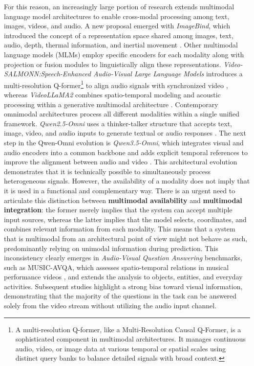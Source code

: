 For this reason, an increasingly large portion of research extends multimodal language model architectures to enable cross-modal processing among text, images, videos, and audio. 
A new proposal emerged with \textit{ImageBind}, which introduced the concept of a representation space shared among images, text, audio, depth, thermal information, and inertial movement \cite{girdhar2023imagebind}.
Other multimodal language models (\acsp{MLM}) employ specific encoders for each modality along with projection or fusion modules to linguistically align these representations. \textit{Video-SALMONN:Speech-Enhanced Audio-Visual Large Language Models} introduces a multi-resolution Q-former\footnote{A multi-resolution Q-former, like a Multi-Resolution Causal Q-Former, is a sophisticated component in multimodal architectures. It manages continuous audio, video, or image data at various temporal or spatial scales using distinct query banks to balance detailed signals with broad context.} to align audio signals with synchronized video \cite{sun2024videosalmonn}, whereas \textit{VideoLLaMA2} combines spatio-temporal modeling and acoustic processing within a generative multimodal architecture \cite{cheng2024videollama2}.
Contemporary omnimodal architectures process all different modalities within a single unified framework. \textit{Qwen2.5-Omni} uses a thinker-talker structure that accepts text, image, video, and audio inputs to generate textual or audio responses \cite{xu2025qwen25omni}. The next step in the Qwen-Omni evolution is \textit{Qwen3.5-Omni}, which integrates visual and audio encoders into a common backbone and adds explicit temporal references to improve the alignment between audio and video \cite{qwen2026qwen35omni}.
This architectural evolution demonstrates that it is technically possible to simultaneously process heterogeneous signals. However, the availability of a modality does not imply that it is used in a functional and complementary way.
There is an urgent need to articulate this distinction between \textbf{multimodal availability} and \textbf{multimodal integration}: the former merely implies that the system can accept multiple input sources, whereas the latter implies that the model selects, coordinates, and combines relevant information from each modality. This means that a system that is multimodal from an architectural point of view might not behave as such, predominantly relying on unimodal information during prediction.
This inconsistency clearly emerges in \textit{Audio-Visual Question Answering} benchmarks, such as MUSIC-\acs{AVQA}, which assesses spatio-temporal relations in musical performance videos \cite{li2022musicavqa}, and extends the analysis to objects, entities, and everyday activities. Subsequent studies highlight a strong bias toward visual information, demonstrating that the majority of the questions in the task can be answered solely from the video stream without utilizing the audio input channel.
